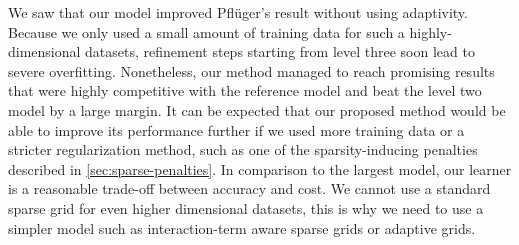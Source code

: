 We saw that our model improved Pflüger's result without using adaptivity.
Because we only used a small amount of training data for such a highly-dimensional datasets, refinement steps starting from level three soon lead to severe overfitting.
Nonetheless, our method managed to reach promising results that were highly competitive with the reference model and beat the level two model by a large margin.
It can be expected that our proposed method would be able to improve its performance further if we used more training data or a stricter regularization method, such as one of the sparsity-inducing penalties described in \cref{sec:sparse-penalties}.
In comparison to the largest model, our learner is a reasonable trade-off
between accuracy and cost.
We cannot use a standard sparse grid for even higher dimensional datasets, this is why we need to use a simpler model such as interaction-term aware sparse
grids or adaptive grids.
